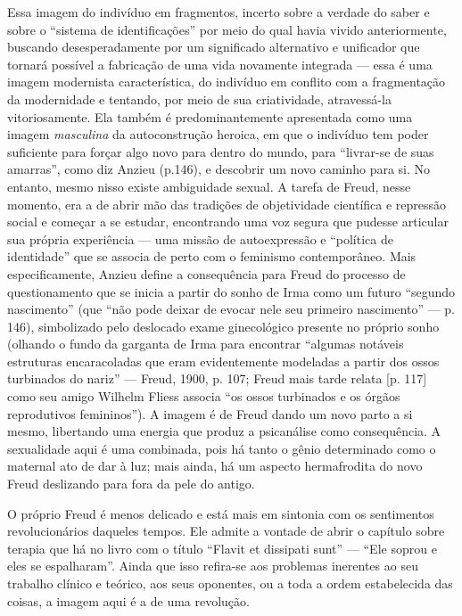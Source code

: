 Essa imagem do indivíduo em fragmentos, incerto sobre a verdade do saber
e sobre o ``sistema de identificações'' por meio do qual havia vivido
anteriormente, buscando desesperadamente por um significado alternativo
e unificador que tornará possível a fabricação de uma vida novamente
integrada --- essa é uma imagem modernista característica, do indivíduo
em conflito com a fragmentação da modernidade e tentando, por meio de
sua criatividade, atravessá-la vitoriosamente. Ela também é
predominantemente apresentada como uma imagem \emph{masculina} da
autoconstrução heroica, em que o indivíduo tem poder suficiente para
forçar algo novo para dentro do mundo, para ``livrar-se de suas
amarras'', como diz Anzieu (p.146), e descobrir um novo caminho para si.
No entanto, mesmo nisso existe ambiguidade sexual. A tarefa de Freud,
nesse momento, era a de abrir mão das tradições de objetividade
científica e repressão social e começar a se estudar, encontrando uma
voz segura que pudesse articular sua própria experiência --- uma missão
de autoexpressão e ``política de identidade'' que se associa de perto
com o feminismo contemporâneo. Mais especificamente, Anzieu define a
consequência para Freud do processo de questionamento que se inicia a
partir do sonho de Irma como um futuro ``segundo nascimento'' (que ``não
pode deixar de evocar nele seu primeiro nascimento'' --- p. 146),
simbolizado pelo deslocado exame ginecológico presente no próprio sonho
(olhando o fundo da garganta de Irma para encontrar ``algumas notáveis
estruturas encaracoladas que eram evidentemente modeladas a partir dos
ossos turbinados do nariz'' --- Freud, 1900, p. 107; Freud mais tarde
relata {[}p. 117{]} como seu amigo Wilhelm Fliess associa ``os ossos
turbinados e os órgãos reprodutivos femininos''). A imagem é de Freud
dando um novo parto a si mesmo, libertando uma energia que produz a
psicanálise como consequência. A sexualidade aqui é uma combinada, pois
há tanto o gênio determinado como o maternal ato de dar à luz; mais
ainda, há um aspecto hermafrodita do novo Freud deslizando para fora da
pele do antigo.

O próprio Freud é menos delicado e está mais em sintonia com os
sentimentos revolucionários daqueles tempos. Ele admite a vontade de
abrir o capítulo sobre terapia que há no livro com o título ``Flavit et
dissipati sunt'' --- ``Ele soprou e eles se espalharam''. Ainda que isso
refira-se aos problemas inerentes ao seu trabalho clínico e teórico, aos
seus oponentes, ou a toda a ordem estabelecida das coisas, a imagem aqui
é a de uma revolução.

